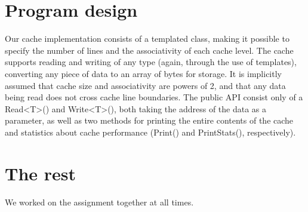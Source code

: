\documentclass[10pt,a4paper,oneside]{article}
\begin{document}
\section{Program design}
Our cache implementation consists of a templated class, making it possible to specify the number of lines and the associativity of each cache level. The cache supports reading and writing of any type (again, through the use of templates), converting any piece of data to an array of bytes for storage. It is implicitly assumed that cache size and associativity are powers of 2, and that any data being read does not cross cache line boundaries. The public API consist only of a Read\textless T\textgreater() and Write\textless T\textgreater(), both taking the address of the data as a parameter, as well as two methods for printing the entire contents of the cache and statistics about cache performance (Print() and PrintStats(), respectively).

\section{The rest}
We worked on the assignment together at all times.
\end{document}
